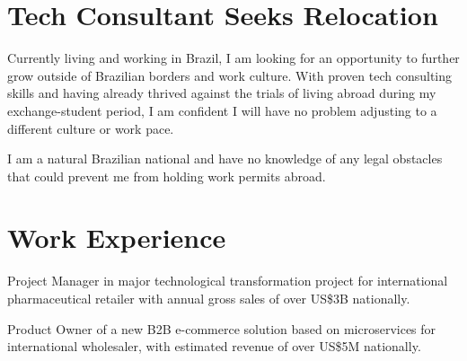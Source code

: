 \documentclass[a4paper]{deedy-resume} %
\begin{document}
\hfill
%
%
\begin{minipage}[t]{0.66\textwidth} %


\section{Tech Consultant Seeks Relocation}
Currently living and working in Brazil, I am looking for an opportunity to further grow outside of Brazilian borders and work culture. With proven tech consulting skills and having already thrived against the trials of living abroad during my exchange-student period, I am confident I will have no problem adjusting to a different culture or work pace.

\vspace{4pt}
I am a natural Brazilian national and have no knowledge of any legal obstacles that could prevent me from holding work permits abroad.

\section{Work Experience}


\vspace{\topsep} %
\begin{tightitemize}
\item Project Manager in major technological transformation project for international pharmaceutical retailer with annual gross sales of over US\$3B nationally.
\item Product Owner of a new B2B e-commerce solution based on microservices for international wholesaler, with estimated revenue of over US\$5M nationally.
\end{tightitemize}

\sectionspace %




\end{minipage}
\end{document}
